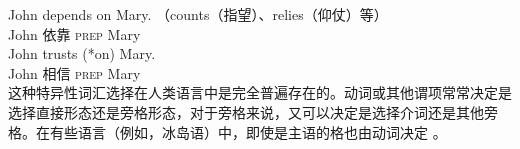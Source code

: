 \begin{exe}
\begin{xlist}[iv.]
\begin{exe}
\begin{xlist}[iv.]
\eal\label{depends-on-ex}
\ex 
\gll John depends on Mary.  （counts（指望）、relies（仰仗）等）\\
     John 依靠 \textsc{prep} Mary\\
\ex 
\gll John trusts (*on) Mary.\\
     John 相信 \textsc{prep} Mary\\
\ex 
{}
\zl
这种特异性词汇选择在人类语言中是完全普遍存在的。动词或其他谓项常常决定是选择直接形态还是旁格形态，对于旁格来说，又可以决定是选择介词还是其他旁格。在有些语言（例如，冰岛语）中，即使是主语的格也由动词决定 \citep*{ZMT85a}。


\end{xlist}
\end{exe}
\end{xlist}
\end{exe}
